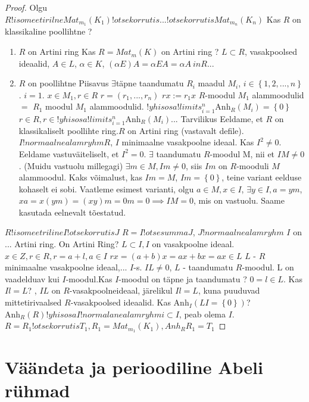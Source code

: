 \documentclass[12pt]{report}
\numberwithin{equation}{section}
\theoremstyle{definition}
\theoremstyle{plain}
\begin{document}
\begin{enumerate}
\begin{proof}
Olgu $R !isomeetirilne Mat_{m_1}(K_1) !otsekorrutis ... !otsekorrutis Mat_{m_n}(K_n)$
Kas $R$ on klassikaline poollihtne ?
\begin{enumerate}
\item $R$ on Artini ring
Kas $R=Mat_{m}(K)$ on Artini ring ?
$L \subset R$, vasakpoolsed ideaalid, $A \in L$, $\alpha \in K$, $(\alpha E)A = \alpha EA = \alpha A \ in R$...
\item $R$ on poollihtne
Piisavus
$\exists $täpne taandumatu $R_i$ maadul $M_i$, $i \in \left\lbrace 1,2,...,n \right\rbrace$.
$i = 1$.
$x \in M_1, r \in R$
$r = \left( r_1,...,r_n \right)$
$rx := r_1 x $
$R$-moodul $M_1$ alammoodulid $=$ $R_1$ moodul $M_1$ alammoodulid.
$!yhisosa !limits_{i=1}^n  \text{Anh}_R (M_i) = \left\lbrace 0 \right\rbrace$
$r \in R, r \in !yhisosa !limits_{i=1}^n  \text{Anh}_R (M_i)$...
Tarvilikus
Eeldame, et $R$ on klassikaliselt poollihte ring.$R$ on Artini ring (vastavalt defile).
$I !normaalnealamryhm R$, $I$ minimaalne vasakpoolne ideaal. Kas $I^2 \neq 0$. Eeldame vastuväiteliselt, et $I^2 = 0$. 
$\exists$ taandumatu $R$-moodul M, nii et $IM \neq 0$. (Muidu vastuolu millegagi)
$\exists m \in M, Im \neq 0$, siis $Im$ on $R$-mooduli $M$ alammoodul. Kaks võimalust, kas $Im = M$, $Im = \left\lbrace 0 \right\rbrace$, teine variant eelduse kohaselt ei sobi. Vaatleme esimest varianti, olgu $a \in M, x \in I$, $\exists y \in I, a = ym$, $xa = x \left( ym \right) = \left( xy \right) m = 0m = 0 \implies IM = 0$, mis on vastuolu.
Saame kasutada eelnevalt tõestatud.
\end{enumerate}
$R !isomeetriline I !otsekorrutis J$
$R = I !otsesumma J$, $J !normaalnealamryhm$
$I$ on ... Artini ring.
On Artini Ring?
$L \subset I, I$ on vasakpoolne ideaal.
$x \in Z, r \in R, r = a +l, a \in I$
$rx = (a +b)x = ax + bx = ax \in L$
$L$ - $R$ minimaalne vasakpoolne ideaal,... $I$-s.
$IL \neq 0$, $L$ - taandumatu $R$-moodul.
L on vaadelduav kui $I$-moodul.Kas $I$-moodul on täpne ja taandumatu ?
$0 = l \in L$. Kas $Il = L$? , $IL$ on $R$-vasakpoolneideaal, järelikul $Il = L$, kuna puuduvad mittetirivaalsed $R$-vasakpoolsed ideaalid. Kas $\text{Anh}_I \left( LI = \left\lbrace 0 \right\rbrace \right)$?
$\text{Anh}_R \left( R \right) !yhisosa I !normalanealamryhm i \subset I$, peab olema $I$. 
$R = R_1 !otsekorrutis T_1, R_1 = Mat_{m_1} \left( K_1 \right) , Anh_{R} R_1 = T_1 $
\end{proof}
\end{enumerate}

\section{Väändeta ja perioodiline Abeli r\"uhmad}
\end{document}
